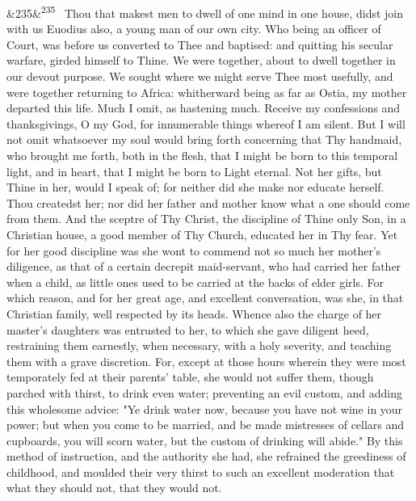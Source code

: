 \documentclass[12pt]{article}
\newcommand{\para}[1][]{\par\noindent\ifx&#1&\else\textsuperscript{\footnotesize #1}~\fi}
\begin{document}
\para[235] Thou that makest men to dwell of one mind in one house, didst join with us Euodius also, a young man of our own city. Who being an officer of Court, was before us converted to Thee and baptised: and quitting his secular warfare, girded himself to Thine. We were together, about to dwell together in our devout purpose. We sought where we might serve Thee most usefully, and were together returning to Africa: whitherward being as far as Ostia, my mother departed this life. Much I omit, as hastening much. Receive my confessions and thanksgivings, O my God, for innumerable things whereof I am silent. But I will not omit whatsoever my soul would bring forth concerning that Thy handmaid, who brought me forth, both in the flesh, that I might be born to this temporal light, and in heart, that I might be born to Light eternal. Not her gifts, but Thine in her, would I speak of; for neither did she make nor educate herself. Thou createdst her; nor did her father and mother know what a one should come from them. And the sceptre of Thy Christ, the discipline of Thine only Son, in a Christian house, a good member of Thy Church, educated her in Thy fear. Yet for her good discipline was she wont to commend not so much her mother's diligence, as that of a certain decrepit maid-servant, who had carried her father when a child, as little ones used to be carried at the backs of elder girls. For which reason, and for her great age, and excellent conversation, was she, in that Christian family, well respected by its heads. Whence also the charge of her master's daughters was entrusted to her, to which she gave diligent heed, restraining them earnestly, when necessary, with a holy severity, and teaching them with a grave discretion. For, except at those hours wherein they were most temporately fed at their parents' table, she would not suffer them, though parched with thirst, to drink even water; preventing an evil custom, and adding this wholesome advice: "Ye drink water now, because you have not wine in your power; but when you come to be married, and be made mistresses of cellars and cupboards, you will scorn water, but the custom of drinking will abide." By this method of instruction, and the authority she had, she refrained the greediness of childhood, and moulded their very thirst to such an excellent moderation that what they should not, that they would not.
\end{document}
